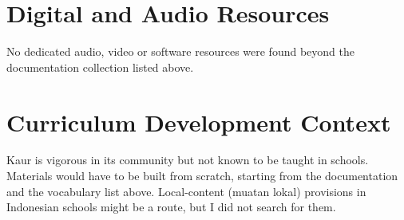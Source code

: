 \documentclass[12pt]{article}
\begin{document}
\section{Digital and Audio Resources}
No dedicated audio, video or software resources were found beyond the documentation collection listed above.

\section{Curriculum Development Context}
Kaur is vigorous in its community but not known to be taught in schools. Materials would have to be built from scratch, starting from the documentation and the vocabulary list above. Local-content (muatan lokal) provisions in Indonesian schools might be a route, but I did not search for them.
\end{document}
